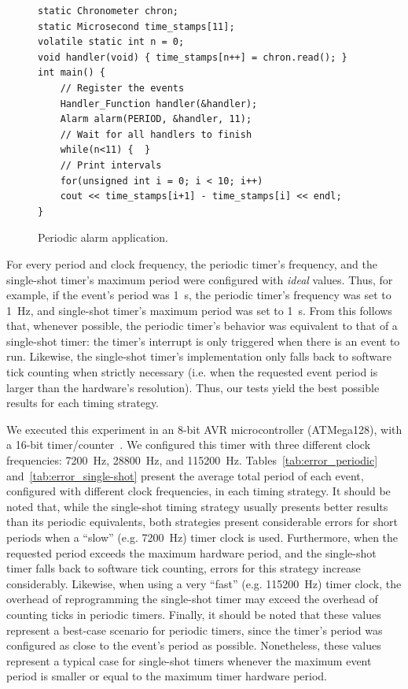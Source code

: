 \documentclass[final,3pd,times]{elsarticle}
\begin{document}
\begin{figure}[bht]
   \lstset{frame=single,language=C++,xleftmargin=2em,style=prg,basicstyle=\scriptsize}
   \begin{lstlisting}
static Chronometer chron;
static Microsecond time_stamps[11];
volatile static int n = 0;
void handler(void) { time_stamps[n++] = chron.read(); }
int main() {
    // Register the events
    Handler_Function handler(&handler);
    Alarm alarm(PERIOD, &handler, 11);
    // Wait for all handlers to finish
    while(n<11) {  }
    // Print intervals
    for(unsigned int i = 0; i < 10; i++)
	cout << time_stamps[i+1] - time_stamps[i] << endl;
}
   \end{lstlisting}
  \caption{Periodic alarm application.}
  \label{prg:alarm}
\end{figure}

For every period and clock frequency, the periodic timer's frequency,
and the single-shot timer's maximum period were configured with
\emph{ideal} values. Thus, for example, if the event's period was 1~s,
the periodic timer's frequency was set to 1~Hz, and single-shot timer's
maximum period was set to 1~s. From this follows that, whenever
possible, the periodic timer's behavior was equivalent to that of a
single-shot timer: the timer's interrupt is only triggered when there is
an event to run. Likewise, the single-shot timer's implementation only
falls back to software tick counting when strictly necessary (i.e. when
the requested event period is larger than the hardware's resolution).
Thus, our tests yield the best possible results for each timing
strategy.

We executed this experiment in an 8-bit AVR microcontroller (ATMega128),
with a 16-bit timer/counter~\cite{atmega128datasheet}.  We configured
this timer with three different clock frequencies: 7200~Hz, 28800~Hz,
and 115200~Hz.  Tables~\ref{tab:error_periodic}
and~\ref{tab:error_single-shot} present the average total period of each
event, configured with different clock frequencies, in each timing
strategy. It should be noted that, while the single-shot timing strategy
usually presents better results than its periodic equivalents, both
strategies present considerable errors for short periods when a ``slow''
(e.g. 7200~Hz) timer clock is used. Furthermore, when the requested
period exceeds the maximum hardware period, and the single-shot timer
falls back to software tick counting, errors for this strategy increase
considerably. Likewise, when using a very ``fast'' (e.g. 115200~Hz)
timer clock, the overhead of reprogramming the single-shot timer may
exceed the overhead of counting ticks in periodic timers. Finally, it
should be noted that these values represent a best-case scenario for
periodic timers, since the timer's period was configured as close to the
event's period as possible. Nonetheless, these values represent a
typical case for single-shot timers whenever the maximum event period is
smaller or equal to the maximum timer hardware period.
\end{document}
